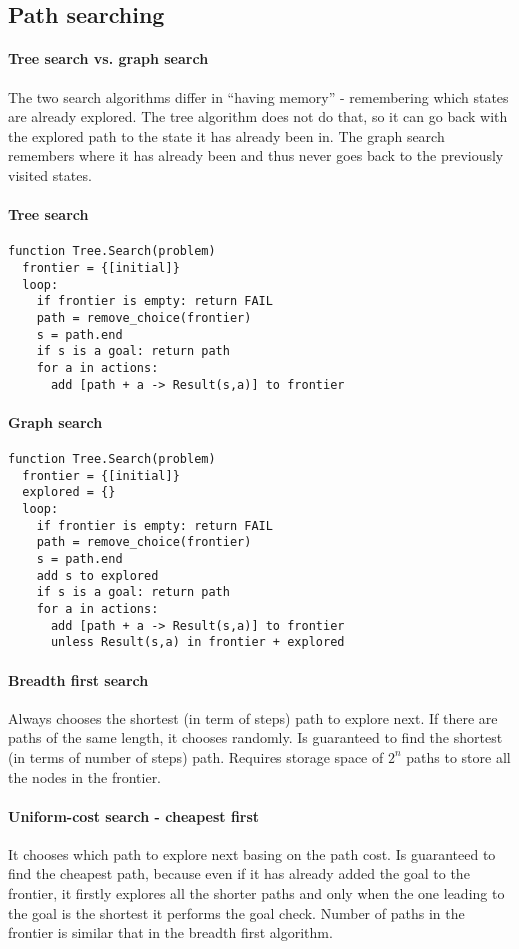 \documentclass[a4paper,10pt]{article}
\begin{document}
\subsection{Path searching}

\paragraph{Tree search vs. graph search} 

The two search algorithms differ in ``having memory'' - remembering which states are already explored. The tree algorithm does not do that, so it can go back with the explored path to the state it has already been in. The graph search remembers where it has already been and thus never goes back to the previously visited states.
\paragraph{Tree search}
\begin{verbatim}
function Tree.Search(problem)
  frontier = {[initial]}
  loop:
    if frontier is empty: return FAIL
    path = remove_choice(frontier)
    s = path.end
    if s is a goal: return path
    for a in actions:
      add [path + a -> Result(s,a)] to frontier
\end{verbatim}

\paragraph{Graph search}
\begin{verbatim}
function Tree.Search(problem)
  frontier = {[initial]}
  explored = {}
  loop:
    if frontier is empty: return FAIL
    path = remove_choice(frontier)
    s = path.end
    add s to explored
    if s is a goal: return path
    for a in actions:
      add [path + a -> Result(s,a)] to frontier 
      unless Result(s,a) in frontier + explored
\end{verbatim}

\paragraph{Breadth first search}
Always chooses the shortest (in term of steps) path to explore next. If there are paths of the same length, it chooses randomly. Is guaranteed to find the shortest (in terms of number of steps) path. Requires storage space of $2^n$ paths to store all the nodes in the frontier.

\paragraph{Uniform-cost search - cheapest first}
It chooses which path to explore next basing on the path cost. Is guaranteed to find the cheapest path, because even if it has already added the goal to the frontier, it firstly explores all the shorter paths and only when the one leading to the goal is the shortest it performs the goal check. Number of paths in the frontier is similar that in the breadth first algorithm.
\end{document}
